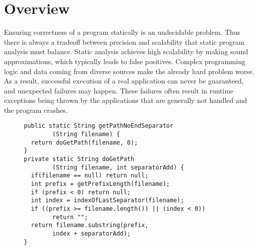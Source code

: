 \section{Overview}
\label{sec:overview}

Ensuring correctness of a program statically is an undecidable problem. Thus
there is always a tradeoff between precision and scalability that static program
analysis must balance. Static analysis achieves high scalability by making sound
approximations, which typically leads to false positives. Complex
programming logic and data coming from diverse sources make the already hard
problem worse. As a result, successful execution of a real application can never
be guaranteed, and unexpected failures may happen. These failures often result
in runtime exceptions being thrown by the applications that are generally not
handled and the program crashes.



\begin{figure}[t]
\centering
\begin{lstlisting}
public static String getPathNoEndSeparator
        (String filename) {
  return doGetPath(filename, 0);
}
private static String doGetPath
        (String filename, int separatorAdd) {
  if(filename == null) return null;
  int prefix = getPrefixLength(filename);
  if (prefix < 0) return null;
  int index = indexOfLastSeparator(filename);
  if ((prefix >= filename.length()) || (index < 0))
        return "";
  return filename.substring(prefix,
        index + separatorAdd);
}
\end{lstlisting}
\end{figure}

